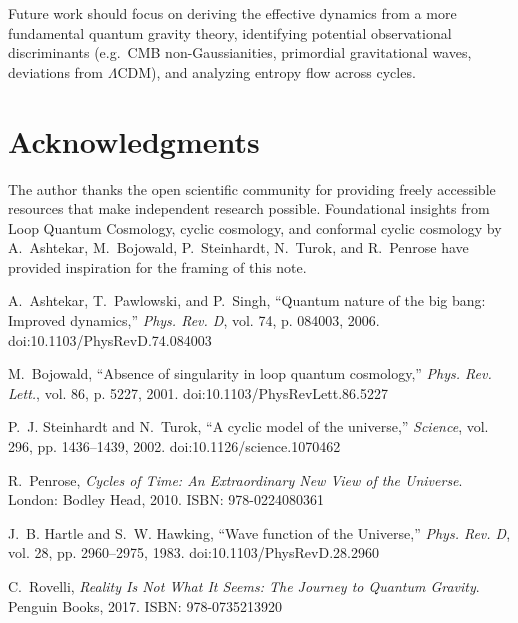 \documentclass[12pt]{article}
\begin{document}
Future work should focus on deriving the effective dynamics from a more fundamental quantum gravity 
theory, identifying potential observational discriminants (e.g.\ CMB non-Gaussianities, primordial 
gravitational waves, deviations from $\Lambda$CDM), and analyzing entropy flow across cycles.

\section*{Acknowledgments}
The author thanks the open scientific community for providing freely accessible resources 
that make independent research possible. Foundational insights from Loop Quantum Cosmology, 
cyclic cosmology, and conformal cyclic cosmology by A.~Ashtekar, M.~Bojowald, P.~Steinhardt, 
N.~Turok, and R.~Penrose have provided inspiration for the framing of this note.

\begin{thebibliography}{9}

A.~Ashtekar, T.~Pawlowski, and P.~Singh,  
``Quantum nature of the big bang: Improved dynamics,''  
\emph{Phys. Rev. D}, vol. 74, p. 084003, 2006.  
doi:10.1103/PhysRevD.74.084003

M.~Bojowald,  
``Absence of singularity in loop quantum cosmology,''  
\emph{Phys. Rev. Lett.}, vol. 86, p. 5227, 2001.  
doi:10.1103/PhysRevLett.86.5227

P.~J. Steinhardt and N.~Turok,  
``A cyclic model of the universe,''  
\emph{Science}, vol. 296, pp. 1436–1439, 2002.  
doi:10.1126/science.1070462

R.~Penrose,  
\emph{Cycles of Time: An Extraordinary New View of the Universe}.  
London: Bodley Head, 2010. ISBN: 978-0224080361

J.~B. Hartle and S.~W. Hawking,  
``Wave function of the Universe,''  
\emph{Phys. Rev. D}, vol. 28, pp. 2960–2975, 1983.  
doi:10.1103/PhysRevD.28.2960

C.~Rovelli,  
\emph{Reality Is Not What It Seems: The Journey to Quantum Gravity}.  
Penguin Books, 2017. ISBN: 978-0735213920

\end{thebibliography}
\end{document}
